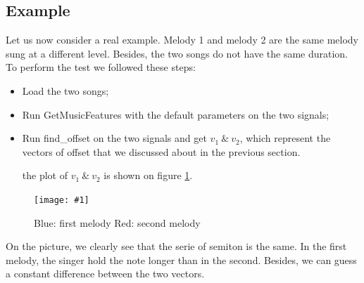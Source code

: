 \documentclass[a4paper]{report}
\newcommand{\img}[3]{\begin{figure}[!h] \centering \texttt{[image: \#1]}\captionsetup{justification=centering} \caption{#3} \label{#1} \end{figure}}
\begin{document}
\subsection{Example}
Let us now consider a real example. Melody 1 and melody 2 are the same melody sung at a different level. Besides, the two songs do not have the same duration.
To perform the test we followed these steps: \begin{itemize}
\item Load the two songs;
\item Run GetMusicFeatures with the default parameters on the two signals;
\item Run find\_offset on the two signals and get $v_{1}~\&~v_{2}$, which represent the vectors of offset that we discussed about in the previous section.

the plot of $v_{1}~\&~v_{2}$ is shown on figure \ref{test_extractor}.
\end{itemize}
\img{test_extractor}{.2}{ {\color{blue}Blue: first melody} {\color{blue}Red: second melody}}
On the picture, we clearly see that the serie of semiton is the same. In the first melody, the singer hold the note longer than in the second. Besides, we can guess a constant difference between the two vectors.
\end{document}
